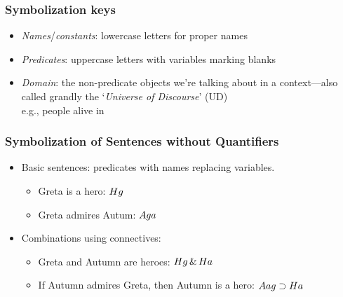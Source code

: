 \begin{frame}
  \frametitle{Symbolization keys}

  \begin{itemize}[<+->]
    \item \emph{Names}/\emph{constants}: lowercase letters for proper names
    \item \emph{Predicates}: uppercase letters with variables marking
    blanks
    \item \emph{Domain}: the non-predicate objects we're talking about in a context---also called grandly the `\emph{Universe of Discourse}' (UD)\\
  \hspace{5em}  e.g., people alive in \year{} %
  \end{itemize}
\end{frame}

\begin{frame}
\frametitle{Symbolization of Sentences without Quantifiers}

\begin{itemize}[<+->]
\item Basic sentences: predicates with names replacing variables.

\bigskip

\begin{itemize}[<+->]
  \item Greta is a hero: \alert{$Hg$}
  \item Greta admires Autum: \alert{$Aga$}
\end{itemize}

\bigskip

\item Combinations using connectives:

\bigskip

\begin{itemize}[<+->]
  \item Greta and Autumn are heroes: \alert{$Hg \,\&\, Ha$}
  \item If Autumn admires Greta, then Autumn is a hero: \alert{$Aag \supset Ha$}
\end{itemize}
  \end{itemize}
\end{frame}

